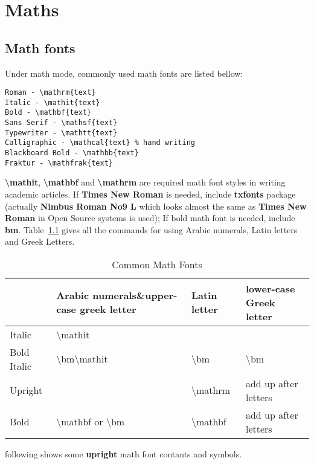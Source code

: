 
\chapter{Maths}
\section{Math fonts}
Under math mode, commonly used math fonts are listed bellow:

\begin{verbatim}
Roman - \mathrm{text}
Italic - \mathit{text}
Bold - \mathbf{text}
Sans Serif - \mathsf{text}
Typewriter - \mathtt{text}
Calligraphic - \mathcal{text} % hand writing
Blackboard Bold - \mathbb{text}
Fraktur - \mathfrak{text}
\end{verbatim}

\textbf{\textbackslash mathit}, \textbf{\textbackslash mathbf} and \textbf{\textbackslash mathrm} are required math font styles in writing academic articles. If \textbf{Times New Roman} is needed, include \textbf{txfonts} package (actually \textbf{Nimbus Roman No9 L} which looks almost the same as \textbf{Times New Roman} in Open Source systems is used); If bold math font is needed, include \textbf{bm}. Table~\ref{table: math fonts} gives all the commands for using Arabic numerals, Latin letters and Greek Letters.

\begin{table}[htbp]
\caption{Common Math Fonts}\label{table: math fonts}
\vspace{-1em}\centering
\begin{tabular}{llll}
\toprule
 & Arabic numerals\&upper-case greek letter & Latin letter & lower-case Greek letter  \\
\midrule
Italic & \textbackslash mathit{} &  & \\
Bold Italic & \textbackslash bm{\textbackslash mathit{}} & \textbackslash bm{} & \textbackslash bm{}\\
Upright &  & \textbackslash mathrm{} & add up after letters\\
Bold & \textbackslash mathbf{} or \textbackslash bm{} & \textbackslash mathbf{} & add up after letters\\
\bottomrule
\end{tabular}
\vspace{\baselineskip}
\end{table}

\noindent following shows some \textbf{upright} math font contants and symbols.

